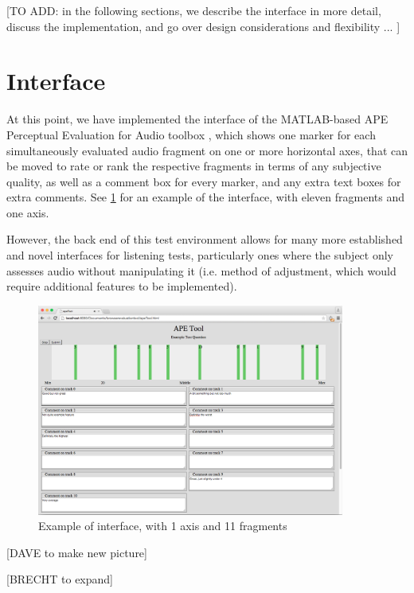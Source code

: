 \documentclass{article}
\begin{document}
[TO ADD: in the following sections, we describe the interface in more detail, discuss the implementation, and go over design considerations and flexibility ... ]


\section{Interface}\label{sec:interface}

At this point, we have implemented the interface of the MATLAB-based APE Perceptual Evaluation for Audio toolbox \cite{deman2014b}, which shows one marker for each simultaneously evaluated audio fragment on one or more horizontal axes, that can be moved to rate or rank the respective fragments in terms of any subjective quality, as well as a comment box for every marker, and any extra text boxes for extra comments. See \ref{fig:interface} for an example of the interface, with eleven fragments and one axis. %

However, the back end of this test environment allows for many more established and novel interfaces for listening tests, particularly ones where the subject only assesses audio without manipulating it (i.e. method of adjustment, which would require additional features to be implemented). 

\begin{figure}[htbp]
\begin{center}
\includegraphics[width=0.9\textwidth]{interface.png}
\caption{Example of interface, with 1 axis and 11 fragments}
\label{fig:interface}
\end{center}
\end{figure}
[DAVE to make new picture]

[BRECHT to expand]
\end{document}
